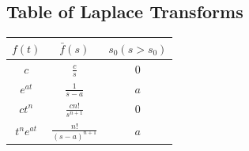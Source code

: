 \documentclass[a4paper, 11pt, normalem]{report}
\begin{document}
\subsection{Table of Laplace Transforms}
\begin{table}[H]
    \centering
    \begin{tabular}{c|c|c}
        $f(t)$ & $\bar{f}(s)$ & $s_0 (s > s_0)$ \\
        \hline
        $c$ & $\frac{c}{s}$ & $0$ \\
        $e^{at}$ & $\frac{1}{s - a}$ & $a$ \\
        $ct^n$ & $\frac{cn!}{s^{n + 1}}$ & $0$ \\
        $t^n e^{at}$ & $\frac{n!}{(s - a)^{n + 1}}$ & $a$
    \end{tabular}
\end{table}
\end{document}
